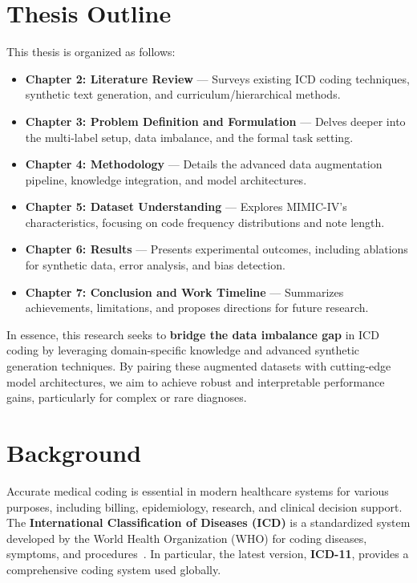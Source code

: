 \documentclass[12pt,a4paper]{report}
\begin{document}
\section{Thesis Outline}
This thesis is organized as follows:
\begin{itemize}
    \item \textbf{Chapter 2: Literature Review} --- Surveys existing ICD coding techniques, synthetic text generation, and curriculum/hierarchical methods.
    \item \textbf{Chapter 3: Problem Definition and Formulation} --- Delves deeper into the multi-label setup, data imbalance, and the formal task setting.
    \item \textbf{Chapter 4: Methodology} --- Details the advanced data augmentation pipeline, knowledge integration, and model architectures.
    \item \textbf{Chapter 5: Dataset Understanding} --- Explores MIMIC-IV’s characteristics, focusing on code frequency distributions and note length.
    \item \textbf{Chapter 6: Results} --- Presents experimental outcomes, including ablations for synthetic data, error analysis, and bias detection.
    \item \textbf{Chapter 7: Conclusion and Work Timeline} --- Summarizes achievements, limitations, and proposes directions for future research.
\end{itemize}

In essence, this research seeks to \textbf{bridge the data imbalance gap} in ICD coding by leveraging domain-specific knowledge and advanced synthetic generation techniques. By pairing these augmented datasets with cutting-edge model architectures, we aim to achieve robust and interpretable performance gains, particularly for complex or rare diagnoses.

\section{Background}
Accurate medical coding is essential in modern healthcare systems for various purposes, including billing, epidemiology, research, and clinical decision support. The \textbf{International Classification of Diseases (ICD)} is a standardized system developed by the World Health Organization (WHO) for coding diseases, symptoms, and procedures~\cite{who2019icd11}. In particular, the latest version, \textbf{ICD-11}, provides a comprehensive coding system used globally.
\end{document}

